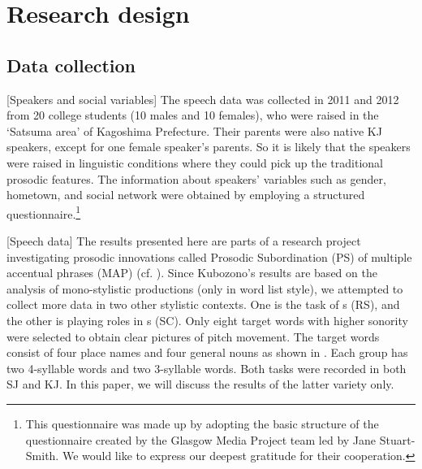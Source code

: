 \documentclass[output=paper]{LSP/langsci}
\begin{document}
\section{Research design}

\subsection{Data collection}

[Speakers and social variables] The speech data was collected in 2011 and 2012 from 20 college students (10 males and 10 females), who were raised in the ‘Satsuma area’ of Kagoshima Prefecture. Their parents were also native KJ speakers, except for one female speaker’s parents. So it is likely that the speakers were raised in linguistic conditions where they could pick up the traditional prosodic features. The information about speakers’ variables such as gender, hometown, and social network were obtained by employing a structured questionnaire.\footnote{ This questionnaire was made up by adopting the basic structure of the questionnaire created by the Glasgow Media Project team led by Jane Stuart-Smith. We would like to express our deepest gratitude for their cooperation.}

[Speech data] The results presented here are parts of a research project investigating prosodic innovations called Prosodic Subordination (PS) of multiple accentual phrases (MAP) (cf. \citealt{androutsopoulos_media_2014}). Since Kubozono’s results are based on the analysis of mono-stylistic productions (only in word list style), we attempted to collect more data in two other stylistic contexts. One is the task of s (RS), and the other is playing roles in s (SC). Only eight target words with higher sonority were selected to obtain clear pictures of pitch movement. The target words consist of four place names and four general nouns as shown in . Each group has two 4-syllable words and two 3-syllable words. Both tasks were recorded in both SJ and KJ. In this paper, we will discuss the results of the latter variety only.
\end{document}
